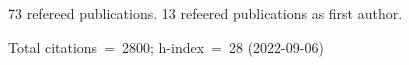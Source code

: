 73 refereed publications. 13 refeered publications as first author.

Total citations~=~2800; h-index~=~28 (2022-09-06)